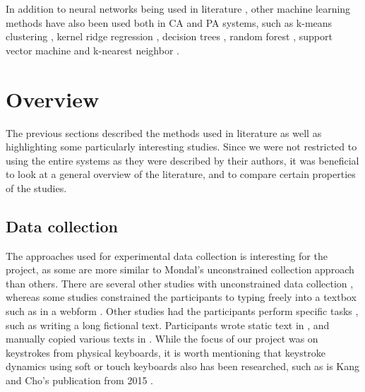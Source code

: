 In addition to neural networks being used in literature \cite{Ahmed, Harun, mondal},
other machine learning methods have also been used both in CA and PA systems, such as k-means clustering \cite{KIM2017, Solami}, kernel ridge regression \cite{900words}, decision trees \cite{alsultan}, random forest \cite{fast}, support vector machine \cite{mondal} and k-nearest neighbor \cite{hu, monaco, KANG201572, stewart, Tappert}.



\section{Overview}
\label{sec:related-overview}
The previous sections described the methods used in literature as well as highlighting some particularly interesting studies.
Since we were not restricted to using the entire systems as they were described by their authors, it was beneficial to look at a general overview of the literature, and to compare certain properties of the studies.

\subsection{Data collection}
\label{sec:related-overview-collection}
The approaches used for experimental data collection is interesting for the project, as some are more similar to Mondal's \cite{mondal} unconstrained collection approach than others.
There are several other studies with unconstrained data collection \cite{Ahmed, BOURS201236, superResults, sliding, Janakiraman2007,  Pinto2014, chi-square, dowl, occ}, whereas some studies constrained the participants to typing freely into a textbox such as in a webform \cite{davoudi2009, davoudi2010, gnp, Solami, KANG201572, markov, meaningless}.
Other studies had the participants perform specific tasks \cite{monaco, Monrose,  park, 900words}, such as writing a long fictional text.
Participants wrote static text in \cite{hu, Kolakowska2011}, and manually copied various texts in \cite{meaningless, alsultan, KIM2017}.
While the focus of our project was on keystrokes from physical keyboards, it is worth mentioning that keystroke dynamics using soft or touch keyboards also has been researched, such as is Kang and Cho's publication from 2015 \cite{KANG201572}.

